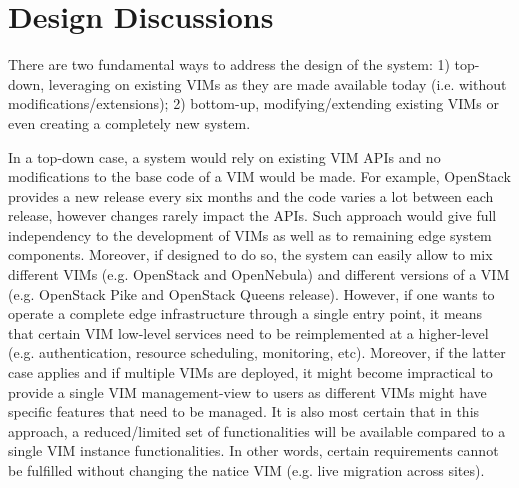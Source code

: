 


\section{Design Discussions}

There are two fundamental ways to address the design of the system: 1) top-down, leveraging on existing VIMs as they are made available today (i.e. without modifications/extensions); 2) bottom-up, modifying/extending existing VIMs or even creating a completely new system. 

In a top-down case, a system  would rely on existing VIM APIs and no modifications to the base code of a VIM would be made. For example, OpenStack provides a new release every six months and the code varies a lot between each release, however changes rarely impact the APIs. Such approach would give full independency to the development of VIMs as well as to remaining edge system components. Moreover, if designed to do so, the system can easily allow to mix different VIMs (e.g. OpenStack and OpenNebula) and different versions of a VIM (e.g. OpenStack Pike and OpenStack Queens release). 
However, if one wants to operate a complete edge infrastructure through a single entry point, it means that certain VIM low-level services need to be reimplemented at a higher-level (e.g. authentication, resource scheduling, monitoring, etc). Moreover, if the latter case applies and if multiple VIMs are deployed, it might become impractical to provide a single VIM management-view to users as different VIMs might have specific features that need to be managed. It is also most certain that in this approach, a reduced/limited set of functionalities will be available compared to a single VIM instance functionalities. In other words, certain requirements cannot be fulfilled without changing the natice VIM (e.g. live migration across sites).





